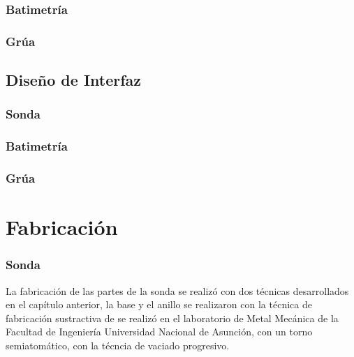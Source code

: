 \subsubsection[Batimetr\'ia]{Batimetr\'ia}
\subsubsection[Gr\'ua ]{Gr\'ua}


\subsection[Dise\~no de Interfaz]{Dise\~no de Interfaz}
\subsubsection[Sonda]{Sonda}
\subsubsection[Batimetr\'ia]{Batimetr\'ia}
\subsubsection[Gr\'ua ]{Gr\'ua}


\section[Fabricaci\'on]{Fabricaci\'on}
\subsubsection[Sonda]{Sonda}
La fabricaci\'on de las partes de la sonda se realiz\'o con dos t\'ecnicas desarrollados en el cap\'itulo anterior, la base y el anillo se realizaron con la t\'ecnica de fabricaci\'on sustractiva de   se realiz\'o en el laboratorio de Metal Mec\'anica de la Facultad de Ingenier\'ia Universidad Nacional de Asunci\'on, con un torno semiatom\'atico, con la t\'ecncia de vaciado progresivo. 
        

